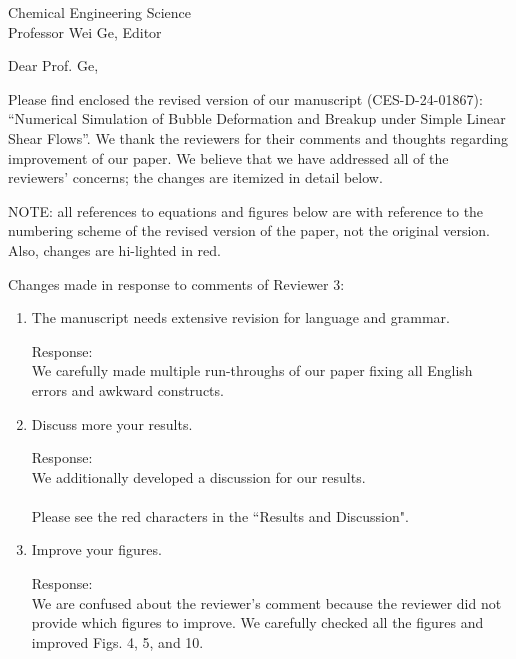 \documentclass{letter}
\date{\today}
\begin{document}
\begin{letter}{
Chemical Engineering Science\\
Professor Wei Ge, Editor\\}

\opening{Dear Prof. Ge,}

Please find enclosed the revised version of our manuscript (CES-D-24-01867):
``Numerical Simulation of Bubble Deformation and Breakup under 
Simple Linear Shear Flows''.
We thank the reviewers for their comments and thoughts regarding improvement 
of our paper. We believe that we have addressed all of the reviewers’ 
concerns; the changes are itemized in detail below.

\par\noindent
NOTE: all references to equations and figures below are with
reference to the numbering scheme of the revised version of the paper,
not the original version.  Also, changes are hi-lighted in red.
\par\noindent

Changes made in response to comments of Reviewer 3: \begin{enumerate}
\item
\textsf
{The manuscript needs extensive revision for language and grammar.}
\vspace{3 mm}

Response: \\
We carefully made multiple run-throughs of our paper fixing all English errors and awkward constructs.\\

\item
\textsf
{Discuss more your results.}
\vspace{3 mm}

Response: \\
We additionally developed a discussion for our results.\\
\\
Please see the red characters in the ``Results and Discussion".
\\

\par\noindent
\item
\textsf
{Improve your figures.}
\vspace{3 mm}

Response: \\
We are confused about the reviewer's comment because the reviewer did not provide which figures to improve.
We carefully checked all the figures and improved Figs. 4, 5, and 10.\\
\\


\end{enumerate}
\end{letter}
\end{document}
